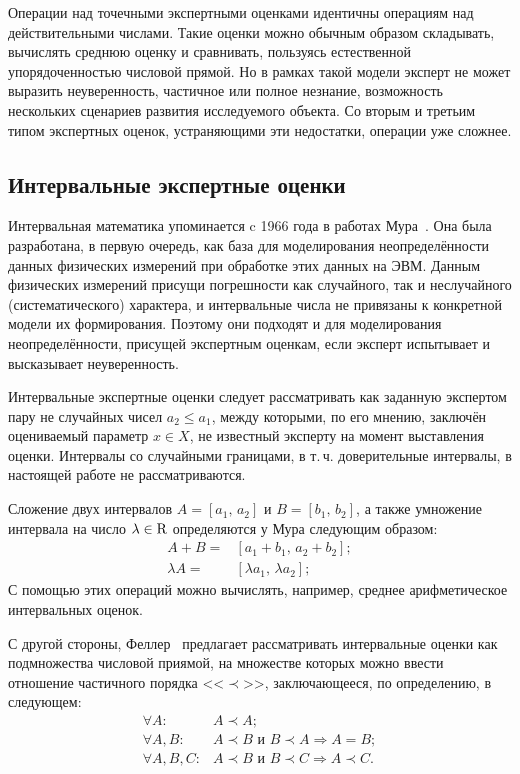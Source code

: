 Операции над точечными экспертными оценками идентичны операциям над действительными числами. Такие оценки можно обычным образом складывать, вычислять среднюю оценку и сравнивать, пользуясь естественной упорядоченностью числовой прямой. Но в рамках такой модели эксперт не может выразить неуверенность, частичное или полное незнание, возможность нескольких сценариев развития исследуемого объекта. Со вторым и третьим типом экспертных оценок, устраняющими эти недостатки, операции уже сложнее.

\subsection{Интервальные экспертные оценки}

Интервальная математика упоминается c 1966 года в работах Мура~\cite{moore1966interval, moore2009introduction}. Она была разработана, в первую очередь, как база для моделирования неопределённости данных физических измерений при обработке этих данных на ЭВМ. Данным физических измерений присущи погрешности как случайного, так и неслучайного (систематического) характера, и интервальные числа не привязаны к конкретной модели их формирования. Поэтому они подходят и для моделирования неопределённости, присущей экспертным оценкам, если эксперт испытывает и высказывает неуверенность. 

Интервальные экспертные оценки следует рассматривать как заданную экспертом пару не случайных чисел $a_2 \leq a_1$, между которыми, по его мнению, заключён оцениваемый параметр $x \in X$, не известный эксперту на момент выставления оценки.  Интервалы со случайными границами, в т.\,ч. доверительные интервалы, в настоящей работе не рассматриваются.

Сложение двух интервалов $A = [a_1,\,a_2]$ и $B = [b_1,\,b_2]$, а также умножение интервала на число $\lambda \in {\mathrm{R}}$ определяются у Мура следующим образом:
\begin{equation*}
\begin{split}
 A + B = & [a_1+b_1,\,a_2+b_2];\\
 \lambda A = & [\lambda a_1, \, \lambda a_2];
\end{split} 
\end{equation*}
С помощью этих операций можно вычислять, например, среднее арифметическое интервальных оценок. 

С другой стороны, Феллер~\cite{cit:feller} предлагает рассматривать интервальные оценки как подмножества числовой приямой, на множестве которых можно ввести отношение частичного порядка <<$\prec$>>, заключающееся, по определению, в следующем:
\begin{equation}
\label{interv_order}
\begin{split}
\forall A: & A \prec A; \\
\forall A, B: & A \prec B \text{ и } B \prec A \Rightarrow A = B; \\
\forall A, B, C: & A \prec B \text{ и } B \prec C \Rightarrow A \prec C.
\end{split}
\end{equation}

